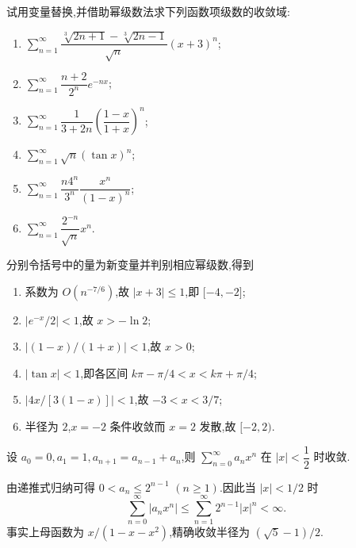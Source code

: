 \begin{example}
    试用变量替换,并借助幂级数法求下列函数项级数的收敛域:
    \begin{enumerate}
        \item $\displaystyle\sum\limits_{n=1}^{\infty}\dfrac{\sqrt[3]{2n+1}-\sqrt[3]{2n-1}}{\sqrt n}(x+3)^n$;
        \item $\displaystyle\sum\limits_{n=1}^{\infty}\dfrac{n+2}{2^n}e^{-nx}$;
        \item $\displaystyle\sum\limits_{n=1}^{\infty}\dfrac{1}{3+2n}\left(\dfrac{1-x}{1+x}\right)^n$;
        \item $\displaystyle\sum\limits_{n=1}^{\infty}\sqrt n(\tan x)^n$;
        \item $\displaystyle\sum\limits_{n=1}^{\infty}\dfrac{n4^n}{3^n}\dfrac{x^n}{(1-x)^n}$;
        \item $\displaystyle\sum\limits_{n=1}^{\infty}\dfrac{2^{-n}}{\sqrt n}x^n$.
    \end{enumerate}
\end{example}
\exampleblank

\begin{solution}
    分别令括号中的量为新变量并判别相应幂级数,得到
    \begin{enumerate}
        \item 系数为 $O(n^{-7/6})$,故 $|x+3|\leq1$,即 $\lbrack-4,-2\rbrack$;
        \item $|e^{-x}/2|<1$,故 $x>-\ln2$;
        \item $|(1-x)/(1+x)|<1$,故 $x>0$;
        \item $|\tan x|<1$,即各区间 $k\pi-\pi/4<x<k\pi+\pi/4$;
        \item $|4x/[3(1-x)]|<1$,故 $-3<x<3/7$;
        \item 半径为 $2$,$x=-2$ 条件收敛而 $x=2$ 发散,故 $\lbrack-2,2)$.
    \end{enumerate}
\end{solution}

\begin{example}
    设 $a_0=0,a_1=1,a_{n+1}=a_{n-1}+a_n$,则 $\displaystyle\sum\limits_{n=0}^{\infty}a_nx^n$ 在 $|x|<\dfrac{1}{2}$ 时收敛.
\end{example}
\exampleblank

\begin{solution}
    由递推式归纳可得 $0<a_n\leq2^{n-1}$ $(n\geq1)$.因此当 $|x|<1/2$ 时
    \[
        \sum\limits_{n=0}^{\infty}|a_nx^n|
        \leq\sum\limits_{n=1}^{\infty}2^{n-1}|x|^n<\infty.
    \]
    事实上母函数为 $x/(1-x-x^2)$,精确收敛半径为 $(\sqrt5-1)/2$.
\end{solution}

